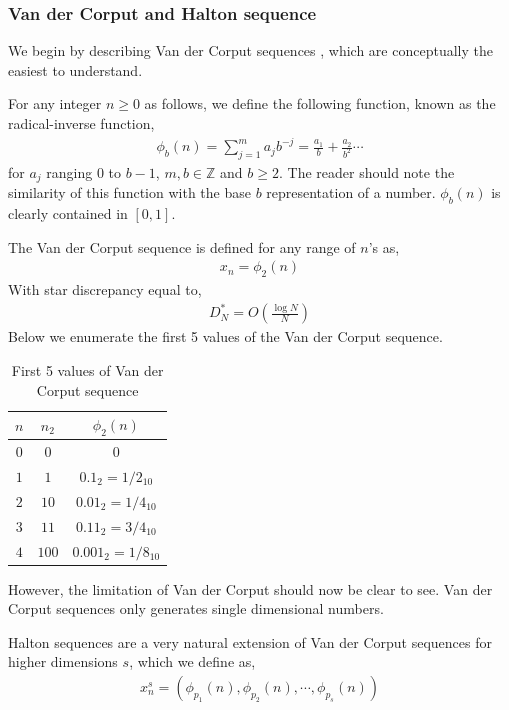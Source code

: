 \documentclass[12pt]{article}
\numberwithin{equation}{section}
\begin{document}
\subsubsection{Van der Corput and Halton sequence}
We begin by describing Van der Corput sequences \cite{kuipers1974uniform}, which are conceptually the easiest to understand. 
\par For any integer $n\geq 0$ as follows, we define the following function, known as the radical-inverse function,
\begin{align}
    \phi_b(n)=\sum_{j=1}^m a_j b^{-j}=\frac{a_1}{b}+\frac{a_2}{b^2}\cdots \label{radicalinverse}
\end{align}
for $a_j$ ranging 0 to $b-1$, $m, b\in \mathbb{Z}$ and $b \geq 2$. The reader should note the similarity of this function with the base $b$ representation of a number. $\phi_b(n)$ is clearly contained in $[0,1]$.
\par The Van der Corput sequence is defined for any range of $n$'s as,
\begin{align}
    x_n=\phi_2(n)
\end{align}
With star discrepancy equal to,
\begin{align}
    D_N^*= O \left( \frac{\log N}{N}\right)
\end{align}
Below we enumerate the first 5 values of the Van der Corput sequence.
\begin{table}[h!]
\centering
\begin{tabular}{ccc}
\hline
$n$ & $n_2$ & $\phi_2(n)$ \\ \hline
$0$ & $0$ & $0$ \\
$1$ & $1$ & $0.1_2=1/2_{10}$ \\
$2$ & $10$ & $0.01_2=1/4_{10}$ \\
$3$ & $11$ & $0.11_2=3/4_{10}$ \\
$4$ & $100$ & $0.001_2=1/8_{10}$ \\ \hline
\end{tabular}
\caption{First 5 values of Van der Corput sequence}
\label{tab:vandercorput}
\end{table}
\par 
However, the limitation of Van der Corput should now be clear to see. Van der Corput sequences only generates single dimensional numbers.
\par Halton sequences \cite{halton} are a very natural extension of Van der Corput sequences for higher dimensions $s$, which we define as,
\begin{align}
    x_n^s=(\phi_{p_1}(n), \phi_{p_2} (n), \cdots,\phi_{p_s}(n))
\end{align}
\end{document}
